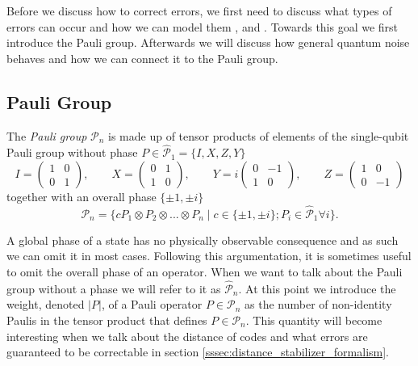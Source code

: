 Before we discuss how to correct errors, we first need to discuss what types of errors can occur and how we can model them \cite{terhal_qec_formalism}, \cite{gottesmann_thesis} and \cite{intro_to_qec}.
Towards this goal we first introduce the Pauli group.
Afterwards we will discuss how general quantum noise behaves and how we can connect it to the Pauli group.

\subsection{Pauli Group}\label{ssec:intro_pauli_group}

The \emph{Pauli group} $\mathcal{P}_n$ is made up of tensor products of elements of the single-qubit Pauli group without phase $P \in \hat{\mathcal{P}}_1 = \{ I,X,Z,Y \}$ 
\begin{equation}
I =
\begin{pmatrix}
1 & 0 \\
0 & 1
\end{pmatrix}, \qquad
X =
\begin{pmatrix}
0 & 1 \\
1 & 0
\end{pmatrix}, \qquad
Y =
i
\begin{pmatrix}
0 & -1 \\
1 & 0
\end{pmatrix}, \qquad
Z =
\begin{pmatrix}
1 & 0 \\
0 & -1
\end{pmatrix}
\end{equation} 
together with an overall phase $\{\pm1,\pm i\}$
\begin{equation}
    \mathcal{P}_n = \{c P_1\otimes P_2 \otimes ... \otimes P_n \mid c \in \{\pm 1, \pm i\}; P_i \in \hat{\mathcal{P}}_1 \forall i \}.
\end{equation}

A global phase of a state has no physically observable consequence and as such we can omit it in most cases.
Following this argumentation, it is sometimes useful to omit the overall phase of an operator.
When we want to talk about the Pauli group without a phase we will refer to it as $\hat{\mathcal{P}}_n$.
At this point we introduce the weight, denoted $|P|$, of a Pauli operator $P\in\mathcal{P}_n$ as the number of non-identity Paulis in the tensor product that defines $P\in\mathcal{P}_n$.
This quantity will become interesting when we talk about the distance of codes and what errors are guaranteed to be correctable in section \ref{sssec:distance_stabilizer_formalism}. 

